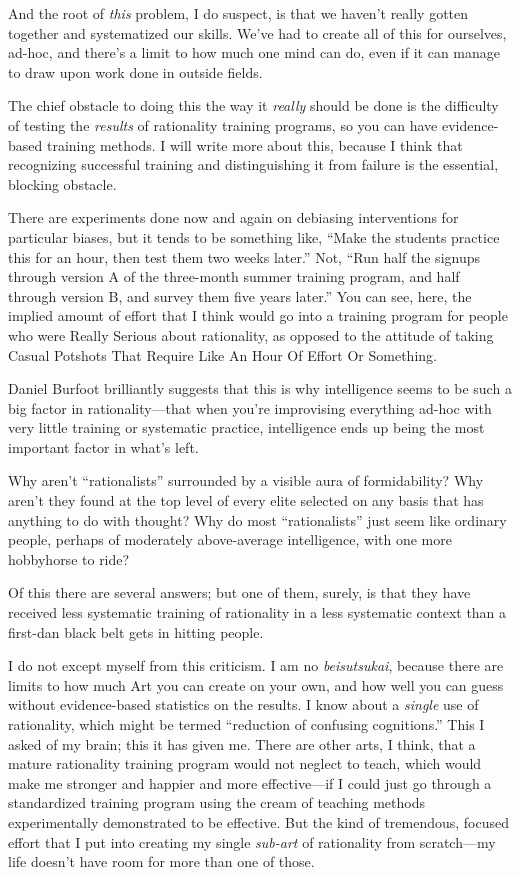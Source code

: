 {
 And the root of \textit{this} problem, I do suspect, is that we
haven't really gotten together and systematized our
skills. We've had to create all of this for ourselves,
ad-hoc, and there's a limit to how much one mind can
do, even if it can manage to draw upon work done in outside fields.}

{
 The chief obstacle to doing this the way it \textit{really} should
be done is the difficulty of testing the \textit{results} of
rationality training programs, so you can have evidence-based training
methods. I will write more about this, because I think that recognizing
successful training and distinguishing it from failure is the
essential, blocking obstacle.}

{
 There are experiments done now and again on debiasing
interventions for particular biases, but it tends to be something like,
``Make the students practice this for an hour, then
test them two weeks later.'' Not,
``Run half the signups through version A of the
three-month summer training program, and half through version B, and
survey them five years later.'' You can see, here,
the implied amount of effort that I think would go into a training
program for people who were Really Serious about rationality, as
opposed to the attitude of taking Casual Potshots That Require Like An
Hour Of Effort Or Something.}

{
 Daniel Burfoot brilliantly suggests that this is why intelligence
seems to be such a big factor in rationality---that when
you're improvising everything ad-hoc with very little
training or systematic practice, intelligence ends up being the most
important factor in what's left.}

{
 Why aren't
``rationalists'' surrounded by a
visible aura of formidability? Why aren't they found at
the top level of every elite selected on any basis that has anything to
do with thought? Why do most
``rationalists'' just seem like
ordinary people, perhaps of moderately above-average intelligence, with
one more hobbyhorse to ride?}

{
 Of this there are several answers; but one of them, surely, is
that they have received less systematic training of rationality in a
less systematic context than a first-dan black belt gets in hitting
people.}

{
 I do not except myself from this criticism. I am no
\textit{beisutsukai}, because there are limits to how much Art you can
create on your own, and how well you can guess without evidence-based
statistics on the results. I know about a \textit{single} use of
rationality, which might be termed ``reduction of
confusing cognitions.'' This I asked of my brain;
this it has given me. There are other arts, I think, that a mature
rationality training program would not neglect to teach, which would
make me stronger and happier and more effective---if I could just go
through a standardized training program using the cream of teaching
methods experimentally demonstrated to be effective. But the kind of
tremendous, focused effort that I put into creating my single
\textit{sub-art} of rationality from scratch---my life
doesn't have room for more than one of those.}

